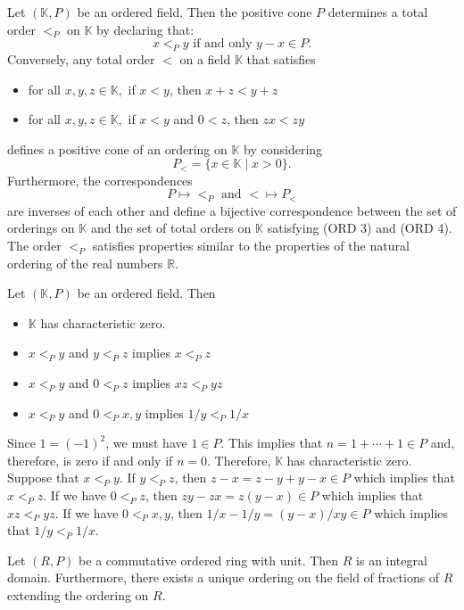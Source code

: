 \documentclass{amsart}
\makeatletter
\renewenvironment{proof}[1][\proofname]{%
   \par\pushQED{\qed}\normalfont%
   \topsep6\p@\@plus6\p@\relax
   \trivlist\item[\hskip\labelsep\bfseries#1\@addpunct{.}]%
   \ignorespaces
}{%
   \popQED\endtrivlist\@endpefalse
}
\makeatother
\begin{document}
Let $(\mathbb{K},P)$ be an ordered field. Then the positive cone $P$ determines a total order $<_P$ on $\mathbb{K}$ by declaring that: 
\[
x<_Py \text{ if and only } y-x \in P.
\]
Conversely, any total order $<$ on a field $\mathbb{K}$ that satisfies 
\begin{itemize}
    \item[(ORD 3)] for all $x,y,z \in \mathbb{K},$ if $x < y$, then $x + z < y+z$ 
    \item[(ORD 4)] for all $x,y,z\in \mathbb{K},$ if $x < y$ and $0 < z $, then $zx < zy$ 
\end{itemize}
defines a positive cone of an ordering on $\mathbb{K}$ by considering 
\[P_< = \{x\in \mathbb{K} \mid x>0\}.\]
Furthermore, the correspondences 
\[
P \longmapsto <_P \text{ and } < \longmapsto P_<
\] 
are inverses of each other and define a bijective correspondence between the set of orderings on $\mathbb{K}$ and the set of total orders on $\mathbb{K}$ satisfying (ORD 3) and (ORD 4). The order $<_P$ satisfies properties similar to the properties of the natural ordering of the real numbers $\mathbb{R}$. 

\begin{lem}\cite[\S 1]{LangAlgebra}
    \label{lem:PropertiesOrderedField}
    Let $(\mathbb{K},P)$ be an ordered field. Then
    \begin{itemize}
        \item $\mathbb{K}$ has characteristic zero. 
        \item $x <_P y$ and $y <_P z$  implies $x <_P z$
        \item $x <_P y$ and $0 <_P z$  implies $xz <_P yz$
        \item $x <_P y$ and $0 <_P x,y$  implies $1/y <_P 1/x$
    \end{itemize}
\end{lem}

\begin{proof}
    Since $1 = (-1)^2$, we must have $1 \in P$. This implies that $n = 1 + \cdots + 1 \in P$ and, therefore, is zero if and only if $n=0$. Therefore, $\mathbb{K}$ has characteristic zero. Suppose that $x<_P y$. If $y <_P z$, then $z-x = z-y + y-x \in P$ which implies that $x<_Pz$. If we have $0<_Pz$, then $zy-zx =z(y-x) \in P$ which implies that $xz <_P yz$. If we have $0<_Px,y$, then $1/x - 1/y = (y-x)/xy \in P$ which implies that $1/y <_P 1/x$.
\end{proof}

\begin{lem}
    \label{lem:OrderedRingIsAnID}
    Let $(R,P)$ be a commutative ordered ring with unit. Then $R$ is an integral domain. Furthermore, there exists a unique ordering on the field of fractions of $R$ extending the ordering on $R$. 
\end{lem}
\end{document}
